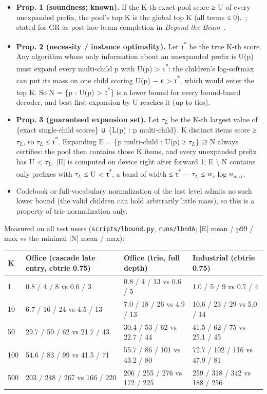\documentclass[11pt]{article}
\newcommand{\code}[1]{\texttt{#1}}
\begin{document}
\begin{itemize}
\item \textbf{Prop. 1 (soundness; known).} If the K-th exact pool score ≥ U of every unexpanded prefix, the pool's top K is the global top K (all terms ≤ 0).~\cite{stahlberg2019,stahlberg2022,fagin2003}; stated for GR as post-hoc beam completion in \emph{Beyond the Beam}~\cite{ax2609.33745}.
\item \textbf{Prop. 2 (necessity / instance optimality).} Let τ\textsuperscript{*} be the true K-th score. Any algorithm whose only information about an unexpanded prefix is U(p) must expand every multi-child p with U(p) > τ\textsuperscript{*}: the children's log-softmax can put its mass on one child scoring U(p) − ε > τ\textsuperscript{*}, which would enter the top K. So N = \{p : U(p) > τ\textsuperscript{*}\} is a lower bound for every bound-based decoder, and best-first expansion by U reaches it (up to ties).
\item \textbf{Prop. 3 (guaranteed expansion set).} Let $τ_{L}$ be the K-th largest value of \{exact single-child scores\} ∪ \{L(p) : p multi-child\}. K distinct items score ≥ $τ_{L}$, so $τ_{L}$ ≤ τ\textsuperscript{*}. Expanding E = \{p multi-child : U(p) ≥ $τ_{L}$\} ⊇ N always certifies: the pool then contains those K items, and every unexpanded prefix has U < $τ_{L}$. |E| is computed on device right after forward 1; E $\setminus$ N contains only prefixes with $τ_{L}$ ≤ U < τ\textsuperscript{*}, a band of width ≤ τ\textsuperscript{*} − $τ_{L}$ ≤ $w_{c}$ log $n_{\max}$.
\item Codebook or full-vocabulary normalization of the last level admits no such lower bound (the valid children can hold arbitrarily little mass), so this is a property of trie normalization only.
\end{itemize}

Measured on all test users (\code{scripts/\allowbreak{}lbound.py}, \code{runs/\allowbreak{}lbndA}; |E| mean / p99 / max vs the minimal |N| mean / max):

{\small
\setlength{\tabcolsep}{4pt}
\begin{longtable}{llll}
\toprule
K & Office (cascade late entry, cbtrie 0.75) & Office (trie, full depth) & Industrial (cbtrie 0.75) \\
\midrule
\endhead
1 & 0.8 / 4 / 8 vs 0.6 / 3 & 0.8 / 4 / 13 vs 0.6 / 5 & 1.0 / 5 / 9 vs 0.7 / 4 \\
10 & 6.7 / 16 / 24 vs 4.5 / 13 & 7.0 / 18 / 26 vs 4.9 / 13 & 10.6 / 23 / 29 vs 5.0 / 14 \\
50 & 29.7 / 50 / 62 vs 21.7 / 43 & 30.4 / 53 / 62 vs 22.7 / 44 & 41.5 / 62 / 75 vs 25.1 / 45 \\
100 & 54.6 / 83 / 99 vs 41.5 / 71 & 55.7 / 86 / 101 vs 43.2 / 80 & 72.7 / 102 / 116 vs 47.9 / 81 \\
500 & 203 / 248 / 267 vs 166 / 220 & 206 / 255 / 276 vs 172 / 225 & 259 / 318 / 342 vs 188 / 256 \\
\bottomrule
\end{longtable}
}
\end{document}
